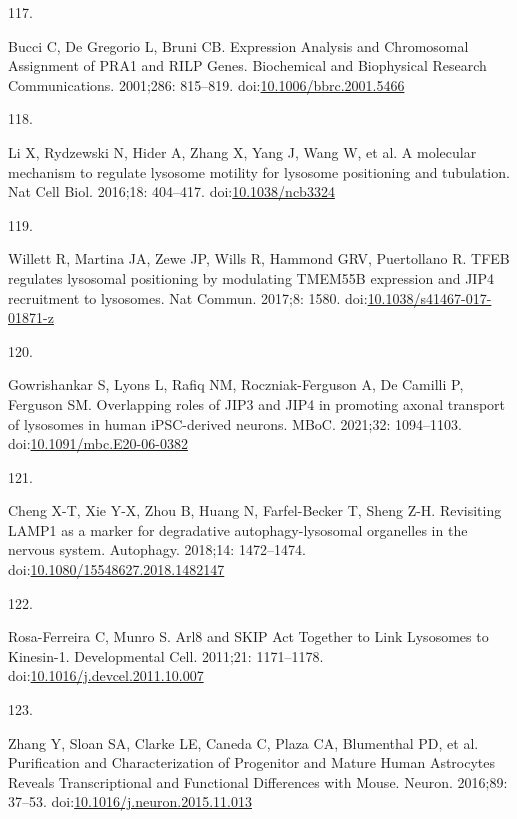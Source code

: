 \documentclass[
  12pt,
  a4paper,
]{book}
\newlength{\cslhangindent}
\newlength{\csllabelwidth}
\newlength{\cslentryspacingunit} %
\newenvironment{CSLReferences}[2] %
 {%
  \setlength{\parindent}{0pt}
  \ifodd #1
  \let\oldpar\par
  \def\par{\hangindent=\cslhangindent\oldpar}
  \fi
  \setlength{\parskip}{#2\cslentryspacingunit}
 }%
 {}
\newcommand{\CSLLeftMargin}[1]{\parbox[t]{\csllabelwidth}{#1}}
\newcommand{\CSLRightInline}[1]{\parbox[t]{\linewidth - \csllabelwidth}{#1}\break}
\begin{document}
\begin{CSLReferences}{0}{0}
\leavevmode{}%
\CSLLeftMargin{117. }%
\CSLRightInline{Bucci C, De Gregorio L, Bruni CB. Expression {Analysis} and {Chromosomal Assignment} of {PRA1} and {RILP Genes}. Biochemical and Biophysical Research Communications. 2001;286: 815--819. doi:\href{https://doi.org/10.1006/bbrc.2001.5466}{10.1006/bbrc.2001.5466}}

\leavevmode{}%
\CSLLeftMargin{118. }%
\CSLRightInline{Li X, Rydzewski N, Hider A, Zhang X, Yang J, Wang W, et al. A molecular mechanism to regulate lysosome motility for lysosome positioning and tubulation. Nat Cell Biol. 2016;18: 404--417. doi:\href{https://doi.org/10.1038/ncb3324}{10.1038/ncb3324}}

\leavevmode{}%
\CSLLeftMargin{119. }%
\CSLRightInline{Willett R, Martina JA, Zewe JP, Wills R, Hammond GRV, Puertollano R. {TFEB} regulates lysosomal positioning by modulating {TMEM55B} expression and {JIP4} recruitment to lysosomes. Nat Commun. 2017;8: 1580. doi:\href{https://doi.org/10.1038/s41467-017-01871-z}{10.1038/s41467-017-01871-z}}

\leavevmode{}%
\CSLLeftMargin{120. }%
\CSLRightInline{Gowrishankar S, Lyons L, Rafiq NM, Roczniak-Ferguson A, De Camilli P, Ferguson SM. Overlapping roles of {JIP3} and {JIP4} in promoting axonal transport of lysosomes in human {iPSC-derived} neurons. MBoC. 2021;32: 1094--1103. doi:\href{https://doi.org/10.1091/mbc.E20-06-0382}{10.1091/mbc.E20-06-0382}}

\leavevmode{}%
\CSLLeftMargin{121. }%
\CSLRightInline{Cheng X-T, Xie Y-X, Zhou B, Huang N, Farfel-Becker T, Sheng Z-H. Revisiting {LAMP1} as a marker for degradative autophagy-lysosomal organelles in the nervous system. Autophagy. 2018;14: 1472--1474. doi:\href{https://doi.org/10.1080/15548627.2018.1482147}{10.1080/15548627.2018.1482147}}

\leavevmode{}%
\CSLLeftMargin{122. }%
\CSLRightInline{Rosa-Ferreira C, Munro S. Arl8 and {SKIP Act Together} to {Link Lysosomes} to {Kinesin-1}. Developmental Cell. 2011;21: 1171--1178. doi:\href{https://doi.org/10.1016/j.devcel.2011.10.007}{10.1016/j.devcel.2011.10.007}}

\leavevmode{}%
\CSLLeftMargin{123. }%
\CSLRightInline{Zhang Y, Sloan SA, Clarke LE, Caneda C, Plaza CA, Blumenthal PD, et al. Purification and {Characterization} of {Progenitor} and {Mature Human Astrocytes Reveals Transcriptional} and {Functional Differences} with {Mouse}. Neuron. 2016;89: 37--53. doi:\href{https://doi.org/10.1016/j.neuron.2015.11.013}{10.1016/j.neuron.2015.11.013}}


\end{CSLReferences}
\end{document}
